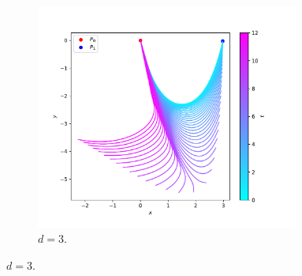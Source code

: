 \documentclass[a4paper, 12pt, slovene]{article}
\numberwithin{equation}{section}
\begin{document}
\begin{figure}[H]
\begin{subfigure}{0.693\textwidth}
	\centering
	\includegraphics[width=0.95\textwidth]{grafi/falling_chain_P.3.0--0.15_L.6_n.48_t.12_r.0.0005_m.0.2_g.1_dt.0.01_freq.25.pdf}
	\caption{$d = 3$.}
	\label{f:hor-3}
\end{subfigure}
\end{figure}
\end{document}
